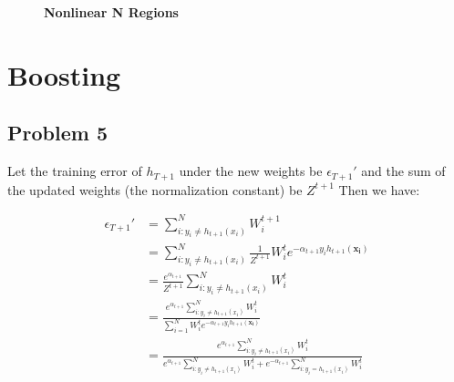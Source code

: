 \documentclass[a4paper,12pt]{article}
\begin{document}
\begin{figure}[h!]\centering%
	  \caption{\textbf{Nonlinear N Regions}}\label{FigExample}
\end{figure}


\section{Boosting} 


\subsection{Problem 5} 

Let the training error of $h_{T+1}$ under the new weights be $\epsilon_{T+1}'$ and the sum of the updated weights (the normalization constant) be $Z^{t+1}$ Then we have:   

$$
\begin{aligned} 
	\epsilon_{T+1}' &= 
	\sum_{i: y_i \neq h_{t+1}(x_i) }^N W_i^{t+1} \\ 
	&= \sum_{i: y_i \neq h_{t+1}(x_i) }^N
	\frac{1}{Z^{t+1}} W_i^{t} e^{
		-\alpha_{t+1}y_ih_{t+1}(\mathbf{x_i}) } \\
	&= \frac{e^{\alpha_{t+1}}}{Z^{t+1}} 
	\sum_{i: y_i \neq h_{t+1}(x_i) }^N W_i^t \\
	&= \frac{e^{\alpha_{t+1}} \sum_{i: y_i \neq h_{t+1}(x_i) }^N W_i^t}{\sum_{i = 1 }^N W_i^{t} 
		e^{-\alpha_{t+1}y_ih_{t+1}(\mathbf{x_i}) } } \\ 
	&= \frac{e^{\alpha_{t+1}} \sum_{i: y_i \neq h_{t+1}(x_i) }^N W_i^t}
	{e^{\alpha_{t+1}}\sum_{i: y_i \neq h_{t+1}(x_i)}^N W_i^t + e^{-\alpha_{t+1}}\sum_{i: y_i = h_{t+1}(x_i)}^N W_i^t }  \\ 
\end{aligned} 
$$
\end{document}
